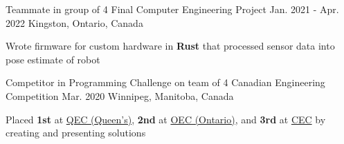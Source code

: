 
\begin{cventries}

  \cventry
    {Teammate in group of 4} %
    {Final Computer Engineering Project} %
    {Jan. 2021 - Apr. 2022} %
    {Kingston, Ontario, Canada} %
    {
      \begin{cvitems} %
        \item{Wrote firmware for custom hardware in \textbf{Rust} that processed sensor data into pose estimate of robot
        }
      \end{cvitems}
    }

  \cventry
    {Competitor in Programming Challenge on team of 4} %
    {Canadian Engineering Competition} %
    {Mar. 2020} %
    {Winnipeg, Manitoba, Canada} %
    {
      \begin{cvitems} %
        \item{Placed \textbf{1st} at \href{https://quengcomp.ca/}{QEC (Queen's)}, \textbf{2nd} at \href{https://www.oec2020.ca/}{OEC (Ontario)}, and \textbf{3rd} at \href{https://cfes.ca/cec/}{CEC} by creating and presenting solutions} %
      \end{cvitems}
    }


\end{cventries}
